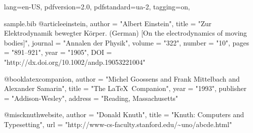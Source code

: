 \DocumentMetadata
  {
    lang=en-US,
    pdfversion=2.0,
    pdfstandard=ua-2,
    tagging=on,
  }
\begin{filecontents}[overwrite]{sample.bib}
@article{einstein,
  author =       "Albert Einstein",
  title =        "{Zur Elektrodynamik bewegter K{\"o}rper}. ({German})
                 [{On} the electrodynamics of moving bodies]",
  journal =      "Annalen der Physik",
  volume =       "322",
  number =       "10",
  pages =        "891--921",
  year =         "1905",
  DOI =          "http://dx.doi.org/10.1002/andp.19053221004"
}

@book{latexcompanion,
    author    = "Michel Goossens and Frank Mittelbach and Alexander Samarin",
    title     = "The \LaTeX\ Companion",
    year      = "1993",
    publisher = "Addison-Wesley",
    address   = "Reading, Massachusetts"
}
 
@misc{knuthwebsite,
    author    = "Donald Knuth",
    title     = "Knuth: Computers and Typesetting",
    url       = "http://www-cs-faculty.stanford.edu/\~{}uno/abcde.html"
}
\end{filecontents}

\documentclass{article}
\usepackage{natbib}
\usepackage{har2nat}
\usepackage{hyperref}



text \cite{einstein}

As  and  describe \ldots

manuals  describe \ldots

\citeyear{latexcompanion}


\medskip






